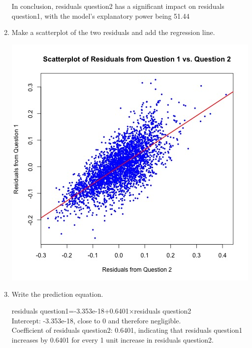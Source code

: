 \documentclass[12pt,letterpaper]{article}
\begin{document}
\begin{enumerate}
		In conclusion, residuals question2 has a significant impact on residuals question1, with the model's explanatory power being 51.44%
		
		
		\item Make a scatterplot of the two residuals and add the regression line. 	
		  
			\includegraphics[width=.85\textwidth]{scatterplot_residuals_question1_vs_question2.jpg}
		
		\item Write the prediction equation.

			residuals question1=-3.353e-18+0.6401×residuals question2\\
			
			Intercept: -3.353e-18, close to 0 and therefore negligible.\\
			Coefficient of residuals question2: 0.6401, indicating that residuals question1\\ increases by 0.6401 for every 1 unit increase in residuals question2.\\
	
		
	\end{enumerate}
	\newpage
\end{document}
